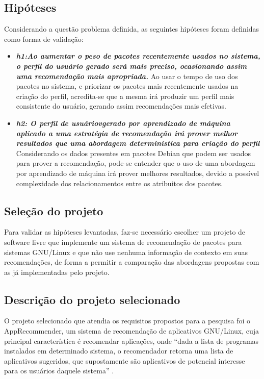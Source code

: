 \subsection{Hipóteses} \label{sec:hipoteses}

Considerando a questão problema definida, as seguintes hipóteses foram definidas
como forma de validação:

\begin{itemize} \item \textit{\textbf{h1:Ao aumentar o peso de pacotes
recentemente usados no sistema, o perfil do usuário gerado será mais preciso,
ocasionando assim uma recomendação mais apropriada.}} Ao usar o tempo de uso dos
pacotes no sistema, e priorizar os pacotes mais recentemente usados na criação
do perfil, acredita-se que a mesma irá produzir um perfil mais
consistente do usuário, gerando assim recomendações mais efetivas.\item
\textit{\textbf{h2: O perfil de usuáriovgerado por aprendizado de máquina aplicado a uma
estratégia de recomendação irá prover melhor resultados que uma abordagem
determinística para criação do perfil}}
Considerando os dados presentes em pacotes Debian que podem ser
usados para prover a recomendação, pode-se entender que o uso de uma abordagem
por aprendizado de máquina irá prover melhores resultados, devido a possível
complexidade dos relacionamentos entre os atribuitos dos pacotes.
\end{itemize}

\subsection{Seleção do projeto}

Para validar as hipóteses levantadas, faz-se necessário escolher um projeto de
software livre que implemente um sistema de recomendação de pacotes
para sistemas GNU/Linux e que não use nenhuma informação de contexto em suas
recomendações, de forma a permitir a comparação das abordagens propostas com as
já implementadas pelo projeto.

\subsection{Descrição do projeto selecionado}

O projeto selecionado que atendia os requisitos propostos para a pesquisa foi o AppRecommender,
um sistema de recomendação de aplicativos GNU/Linux, cuja principal característica é recomendar aplicações,
onde “dada a lista de programas instalados em determinado sistema, o recomendador retorna uma lista de aplicativos
sugeridos, que supostamente são aplicativos de potencial interesse para os usuários daquele sistema”
\cite{araujo2011apprecommender}.

